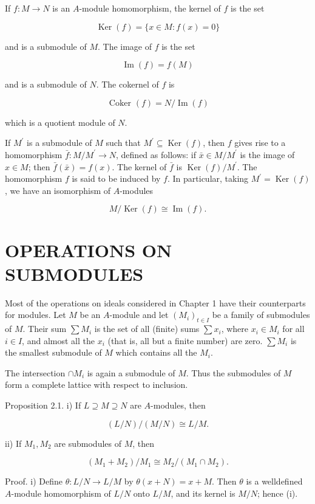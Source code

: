 \documentclass{standalone}
\theoremstyle{definition}
\theoremstyle{remark}
\begin{document}
If $f: M \rightarrow N$ is an $A$-module homomorphism, the kernel of $f$ is the set

\[
\operatorname{Ker}(f)=\{x \in M: f(x)=0\}
\]

and is a submodule of $M$. The image of $f$ is the set

\[
\operatorname{Im}(f)=f(M)
\]

and is a submodule of $N$. The cokernel of $f$ is

\[
\text { Coker }(f)=N / \operatorname{Im}(f)
\]

which is a quotient module of $N$.

If $M^{\prime}$ is a submodule of $M$ such that $M^{\prime} \subseteq \operatorname{Ker}(f)$, then $f$ gives rise to a homomorphism $\bar{f}: M / M^{\prime} \rightarrow N$, defined as follows: if $\bar{x} \in M / M^{\prime}$ is the image of $x \in M$; then $\bar{f}(\bar{x})=f(x)$. The kernel of $\bar{f}$ is $\operatorname{Ker}(f) / M^{\prime}$. The homomorphism $f$ is said to be induced by $f$. In particular, taking $M^{\prime}=\operatorname{Ker}(f)$, we have an isomorphism of $A$-modules

\[
M / \operatorname{Ker}(f) \cong \operatorname{Im}(f) .
\]

\section{OPERATIONS ON SUBMODULES}
Most of the operations on ideals considered in Chapter 1 have their counterparts for modules. Let $M$ be an $A$-module and let $\left(M_{i}\right)_{t \in I}$ be a family of submodules of $M$. Their sum $\sum M_{i}$ is the set of all (finite) sums $\sum x_{i}$, where $x_{i} \in M_{i}$ for all $i \in I$, and almost all the $x_{i}$ (that is, all but a finite number) are zero. $\sum M_{i}$ is the smallest submodule of $M$ which contains all the $M_{i}$.

The intersection $\cap M_{i}$ is again a submodule of $M$. Thus the submodules of $M$ form a complete lattice with respect to inclusion.

Proposition 2.1. i) If $L \supseteq M \supseteq N$ are $A$-modules, then

\[
(L / N) /(M / N) \cong L / M .
\]

ii) If $M_{1}, M_{2}$ are submodules of $M$, then

\[
\left(M_{1}+M_{2}\right) / M_{1} \cong M_{2} /\left(M_{1} \cap M_{2}\right) .
\]

Proof. i) Define $\theta: L / N \rightarrow L / M$ by $\theta(x+N)=x+M$. Then $\theta$ is a welldefined $A$-module homomorphism of $L / N$ onto $L / M$, and its kernel is $M / N$; hence (i).
\end{document}
